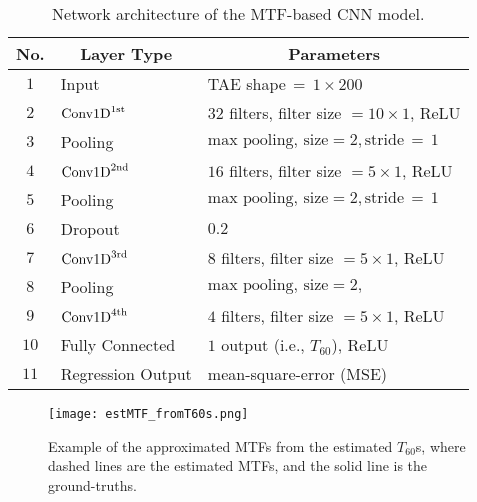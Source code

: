 \documentclass[conference]{IEEEtran}
\begin{document}
	\begin{table}[ht]
		\centering
		\caption{Network architecture of the MTF-based CNN model.}
		\label{tab:Network}
		\begin{tabular}{@{}cll@{}}
			\toprule
			No. & \multicolumn{1}{c}{Layer Type} & \multicolumn{1}{c}{Parameters}    \\ \midrule
			$1$   & Input                          & TAE shape$\,=\,1\times200$                             \\
			$2$   &$\text{Conv1D}^{\small{1}\text{st}}$                     &$32$ filters, filter size $\!=\!10\times1$, ReLU \\
			$3$  & Pooling                    &  $\text{max pooling, size}=2, \text{stride}\,=\,1$                        \\	
			$4$  &$\text{Conv1D}^{\small{2}\text{nd}}$                    &$ 16$ filters, filter size $\!=\!5\times1$, ReLU \\
			$5$  & Pooling                    &  $\text{max pooling, size}=2, \text{stride}\,=\,1$                        \\
			$6$   & Dropout                        & $0.2$                               \\
			$7$  &$\text{Conv1D}^{\small{3}\text{rd}}$              &$8$ filters, filter size $\!=\!5\times1$, ReLU \\
			$8$  & Pooling                    &  $\text{max pooling, size}=2,$\\
			$9$  &$\text{Conv1D}^{\small{4}\text{th}}$              &$4$ filters, filter size   $\!=\!5\times1$, ReLU                   \\
			$10$  & Fully Connected                & $1$ output (i.e., $T_{60}$), ReLU                            \\
			$11$  & Regression Output              & mean-square-error (MSE)      \\ \bottomrule  	
		\end{tabular}
	\end{table}
	
	\begin{figure}[h]
		\centering
		\texttt{[image: estMTF\_fromT60s.png]}
		\caption{Example of the approximated MTFs from the estimated $T_{60}$s, where dashed lines are the estimated MTFs, and the solid line is the ground-truths.} %
		\label{fig:estMTF_fromT60s}
	\end{figure}
\end{document}
